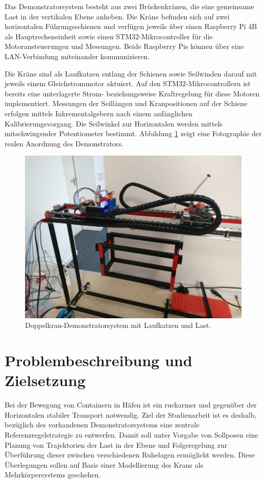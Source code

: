 Das Demonstratorsystem besteht aus zwei Brückenkränen, die eine gemeinsame Last in der vertikalen Ebene anheben. Die Kräne befinden sich auf zwei horizontalen Führungsschienen und verfügen jeweils über einen Raspberry Pi 4B als Hauptrecheneinheit sowie einen STM32-Mikrocontroller für die Motoransteuerungen und Messungen. Beide Raspberry Pis können über eine LAN-Verbindung miteinander kommunizieren.

Die Kräne sind als Laufkatzen entlang der Schienen sowie Seilwinden darauf mit jeweils einem Gleichstrommotor aktuiert. Auf den STM32-Mikrocontrollern ist bereits eine unterlagerte Strom- beziehungsweise Kraftregelung für diese Motoren implementiert.
Messungen der Seillängen und Kranpositionen auf der Schiene erfolgen mittels Inkrementalgebern nach einem anfänglichen Kalibrierungsvorgang. Die Seilwinkel zur Horizontalen werden mittels mitschwingender Potentiometer bestimmt. Abbildung \ref{fig:demonstrator_real} zeigt
eine Fotographie der realen Anordnung des Demonstrators.

\begin{figure}[ht]
	\begin{center}
		\includegraphics[scale=1]{Pictures/real_gantry.jpg}
	\end{center}
	\caption[Doppelkran-Demonstratorsystem mit Laufkatzen und Last]
	{Doppelkran-Demonstratorsystem mit Laufkatzen und Last.}
	\label{fig:demonstrator_real}
\end{figure}

\section{Problembeschreibung und Zielsetzung}
Bei der Bewegung von Containern in Häfen ist ein ruckarmer und gegenüber der Horizontalen stabiler Transport notwendig. Ziel der Studienarbeit ist es deshalb,  bezüglich des vorhandenen Demonstratorsystems eine zentrale Referenzregelstrategie zu entwerfen. Damit soll unter Vorgabe von Sollposen eine Planung von Trajektorien der Last in der Ebene und Folgeregelung zur Überführung dieser zwischen verschiedenen Ruhelagen ermöglicht werden. Diese Überlegungen sollen auf Basis einer Modellierung des Krans als Mehrkörpersystems geschehen. 

